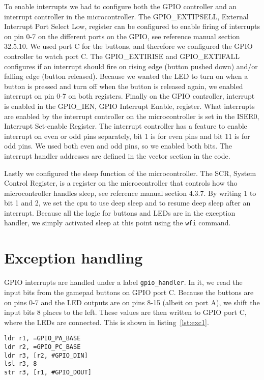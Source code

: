 To enable interrupts we had to configure both the GPIO controller and an interrupt controller in the microcontroller. The GPIO\_EXTIPSELL, External Interrupt Port Select Low, register can be configured to enable firing of interrupts on pin 0-7 on the different ports on the GPIO, see reference manual\cite{efm32ggrm} section 32.5.10. We used port C for the buttons, and therefore we configured the GPIO controller to watch port C. The GPIO\_EXTIRISE and GPIO\_EXTIFALL configures if an interrupt should fire on rising edge (button pushed down) and/or falling edge (button released). Because we wanted the LED to turn on when a button is pressed and turn off when the button is released again, we enabled interrupt on pin 0-7 on both registers. Finally on the GPIO controller, interrupt is enabled in the GPIO\_IEN, GPIO Interrupt Enable, register. What interrupts are enabled by the interrupt controller on the microcontroller is set in the ISER0, Interrupt Set-enable Register\cite{cortexm3rm}. The interrupt controller has a feature to enable interrupt on even or odd pins separately, bit 1 is for even pins and bit 11 is for odd pins. We used both even and odd pins, so we enabled both bits. The interrupt handler addresses are defined in the vector section in the code.

Lastly we configured the sleep function of the microcontroller. The SCR, System Control Register, is a register on the microcontroller that controls how tho microcontroller handles sleep, see reference manual\cite{cortexm3rm} section 4.3.7. By writing 1 to bit 1 and 2, we set the cpu to use deep sleep and to resume deep sleep after an interrupt. Because all the logic for buttons and LEDs are in the exception handler, we simply activated sleep at this point using the \texttt{wfi} command.

\section{Exception handling}
\label{sec:exceptions}

GPIO interrupts are handled under a label \texttt{gpio\_handler}. In it, we read the input bits from the gamepad buttons on GPIO port C. Because the buttons are on pins 0-7 and the LED outputs are on pins 8-15 (albeit on port A), we shift the input bits 8 places to the left. These values are then written to GPIO port C, where the LEDs are connected. This is shown in listing~\ref{lst:exc1}.

\begin{lstlisting}[label=lst:exc1, caption=Reading input pins from port C and writing output bits on port A.]
ldr r1, =GPIO_PA_BASE
ldr r2, =GPIO_PC_BASE
ldr r3, [r2, #GPIO_DIN]
lsl r3, 8
str r3, [r1, #GPIO_DOUT]
\end{lstlisting}

